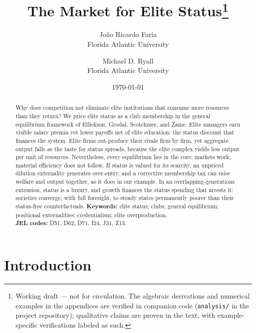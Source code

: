\documentclass[12pt,letterpaper]{article}
\title{The Market for Elite Status\thanks{Working draft --- not for circulation.
The algebraic derivations and numerical examples in the appendices are verified in companion code (\texttt{analysis/} in the project repository); qualitative claims are proven in the text, with example-specific verifications labeled as such.}}
\author{Jo\~{a}o Ricardo Faria\\ Florida Atlantic University
  \and Michael D. Ryall\\ Florida Atlantic University}
\date{\today}
\theoremstyle{definition}
\begin{document}
\maketitle

\begin{abstract}
\noindent Why does competition not eliminate elite institutions that consume more resources than they return?
We price elite status as a club membership in the general equilibrium framework of Ellickson, Grodal, Scotchmer, and Zame.
Elite managers earn visible salary premia yet lower payoffs net of elite education: the status discount that finances the system.
Elite firms out-produce their rivals firm by firm, yet aggregate output falls as the taste for status spreads, because the elite complex yields less output per unit of resources.
Nevertheless, every equilibrium lies in the core: markets work; material efficiency does not follow.
If status is valued for its scarcity, an unpriced dilution externality generates over-entry, and a corrective membership tax can raise welfare and output together, as it does in our example.
In an overlapping-generations extension, status is a luxury, and growth finances the status spending that arrests it: societies converge, with full foresight, to steady states permanently poorer than their status-free counterfactuals.
\medskip
\noindent\textbf{Keywords:} elite status; clubs; general equilibrium; positional externalities; credentialism; elite overproduction.\\
\textbf{JEL codes:} D51, D62, D71, I24, J31, Z13.
\end{abstract}

\onehalfspacing

\section{Introduction}\label{sec:intro}
\end{document}
